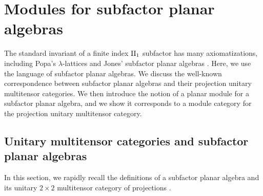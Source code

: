 \documentclass[11pt]{article}
\theoremstyle{plain}
\theoremstyle{definition}
\begin{document}
\section{Modules for subfactor planar algebras} 
\label{sec:Modules}

The standard invariant of a finite index ${\rm II}_1$ subfactor has many axiomatizations, including Popa's $\lambda$-lattices \cite{MR1334479} and Jones' subfactor planar algebras \cite{math.QA/9909027}.
Here, we use the language of subfactor planar algebras.
We discuss the well-known correspondence between subfactor planar algebras and their projection unitary multitensor categories.
We then introduce the notion of a planar module for a subfactor planar algebra, and we show it corresponds to a module category for the projection unitary multitensor category.

\subsection{Unitary multitensor categories and subfactor planar algebras}  
\label{sec:CategoriesPlanarAlgberasLattices}

In this section, we rapidly recall the definitions of a subfactor planar algebra \cite{math.QA/9909027} and its unitary $2\times 2$ multitensor category of projections \cite{MR2811311,1808.00323}.
\end{document}
